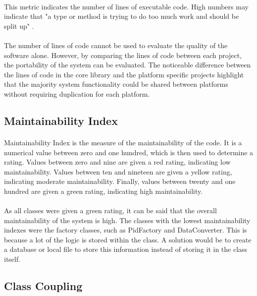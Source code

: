{		\paragraph{}{
		This metric indicates the number of lines of executable code. High numbers may indicate that "a type or method is trying to do too much work and should be split up" \cite{CodeMetrics}.
		}
		\paragraph{}{
		The number of lines of code cannot be used to evaluate the quality of the software alone. However,  by comparing the lines of code between each project, the portability of the system can be evaluated. The noticeable difference between the lines of code in the core library and the platform specific projects highlight that the majority system functionality could be shared between platforms without requiring duplication for each platform.
		}
		
	\subsection*{Maintainability Index}
		\paragraph{}{
		Maintainability Index is the measure of the maintainability of the code. It is a numerical value between zero and one hundred, which is then used to determine a rating. Values between zero and nine are given a red rating, indicating low maintainability. Values between ten and nineteen are given a yellow rating, indicating moderate maintainability. Finally, values between twenty and one hundred are given a green rating, indicating high maintainability.
		}
		\paragraph{}{
		As all classes were given a green rating, it can be said that the overall maintainability of the system is high. The classes with the lowest maintainability indexes were the factory classes, such as PidFactory and DataConverter. This is because a lot of the logic is stored within the class. A solution would be to create a database or local file to store this information instead of storing it in the class itself.
		}
	
	\subsection*{Class Coupling}
}
